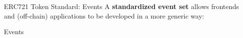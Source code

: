 \documentclass[handout]{beamer}
\begin{document}

\begin{frame}{ERC721 Token Standard: Events}
\vspace{0.5em}
	A \textbf{standardized event set} allows frontends and (off-chain) applications to be developed in a more generic way:
\vspace{1em}
	\begin{samplecode}{Events}
		
	\end{samplecode}
\end{frame}
\end{document}
